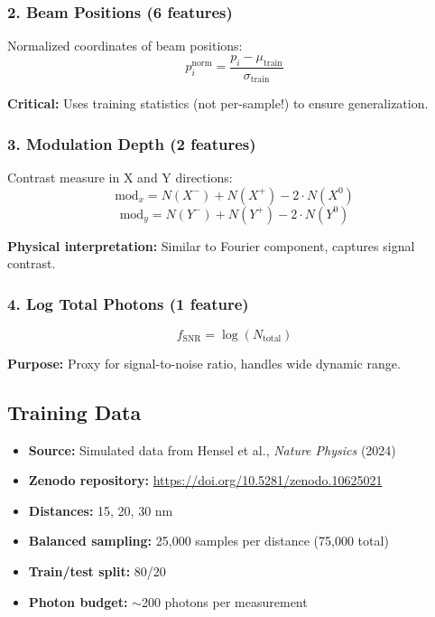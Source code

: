\documentclass[a4paper,11pt]{article}
\begin{document}
\subsubsection{2. Beam Positions (6 features)}

Normalized coordinates of beam positions:
\begin{equation}
p_i^{\text{norm}} = \frac{p_i - \mu_{\text{train}}}{\sigma_{\text{train}}}
\end{equation}

\textbf{Critical:} Uses training statistics (not per-sample!) to ensure generalization.

\subsubsection{3. Modulation Depth (2 features)}

Contrast measure in X and Y directions:
\begin{equation}
\text{mod}_x = N(X^-) + N(X^+) - 2 \cdot N(X^0)
\end{equation}
\begin{equation}
\text{mod}_y = N(Y^-) + N(Y^+) - 2 \cdot N(Y^0)
\end{equation}

\textbf{Physical interpretation:} Similar to Fourier component, captures signal contrast.

\subsubsection{4. Log Total Photons (1 feature)}

\begin{equation}
f_{\text{SNR}} = \log(N_{\text{total}})
\end{equation}

\textbf{Purpose:} Proxy for signal-to-noise ratio, handles wide dynamic range.

\subsection{Training Data}

\begin{itemize}[leftmargin=*]
    \item \textbf{Source:} Simulated data from Hensel et al., \textit{Nature Physics} (2024)
    \item \textbf{Zenodo repository:} \url{https://doi.org/10.5281/zenodo.10625021}
    \item \textbf{Distances:} 15, 20, 30 nm
    \item \textbf{Balanced sampling:} 25,000 samples per distance (75,000 total)
    \item \textbf{Train/test split:} 80/20
    \item \textbf{Photon budget:} $\sim$200 photons per measurement
\end{itemize}
\end{document}
